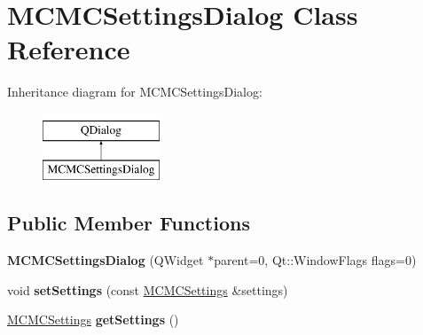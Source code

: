\hypertarget{class_m_c_m_c_settings_dialog}{\section{M\-C\-M\-C\-Settings\-Dialog Class Reference}
\label{class_m_c_m_c_settings_dialog}
}
Inheritance diagram for M\-C\-M\-C\-Settings\-Dialog\-:\begin{figure}[H]
\begin{center}
\leavevmode
\includegraphics[height=2.000000cm]{class_m_c_m_c_settings_dialog}
\end{center}
\end{figure}
\subsection*{Public Member Functions}
\begin{DoxyCompactItemize}
\item 
\hypertarget{class_m_c_m_c_settings_dialog_ac2cf37b854513036acb045099e01780c}{{\bfseries M\-C\-M\-C\-Settings\-Dialog} (Q\-Widget $\ast$parent=0, Qt\-::\-Window\-Flags flags=0)}\label{class_m_c_m_c_settings_dialog_ac2cf37b854513036acb045099e01780c}

\item 
\hypertarget{class_m_c_m_c_settings_dialog_a6dd531d8ac3a2fa5a5deeebfc43eab20}{void {\bfseries set\-Settings} (const \hyperlink{class_m_c_m_c_settings}{M\-C\-M\-C\-Settings} \&settings)}\label{class_m_c_m_c_settings_dialog_a6dd531d8ac3a2fa5a5deeebfc43eab20}

\item 
\hypertarget{class_m_c_m_c_settings_dialog_a0d0c8ecf23182853584bde65a21776ea}{\hyperlink{class_m_c_m_c_settings}{M\-C\-M\-C\-Settings} {\bfseries get\-Settings} ()}\label{class_m_c_m_c_settings_dialog_a0d0c8ecf23182853584bde65a21776ea}

\end{DoxyCompactItemize}
